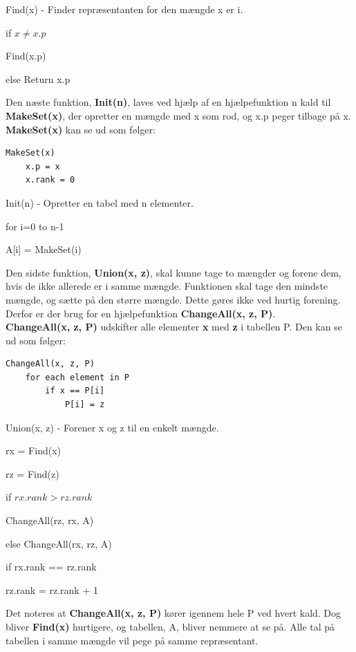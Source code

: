 \documentclass[a4paper,10pt]{article}
\begin{document}
\begin{algorithm}[H]
\caption{Find(x) - Finder repræsentanten for den mængde x er i.}
\begin{algorithmic}[2]
\State \parbox[t]{.7\linewidth}{if $x \neq x.p$}
\Indent
\State \parbox[t]{.7\linewidth}{Find(x.p)}
\EndIndent
\State \parbox[t]{.7\linewidth}{else Return x.p}
\EndFunction
\end{algorithmic}
\end{algorithm}

Den næste funktion, \textbf{Init(n)}, laves ved hjælp af en hjælpefunktion n kald til \textbf{MakeSet(x)}, der opretter en mængde med x som rod, og x.p peger tilbage på x.\\
\textbf{MakeSet(x)} kan se ud som følger:
\begin{verbatim}
MakeSet(x)
    x.p = x
    x.rank = 0
\end{verbatim}

\begin{algorithm}[H]
\caption{Init(n) - Opretter en tabel med n elementer.}
\begin{algorithmic}[2]
\State \parbox[t]{.7\linewidth}{for i=0 to n-1}
\Indent
\State \parbox[t]{.7\linewidth}{A[i] = MakeSet(i)}
\EndIndent
\EndFunction
\end{algorithmic}
\end{algorithm}

Den sidste funktion, \textbf{Union(x, z)}, skal kunne tage to mængder og forene dem, hvis de ikke allerede er i samme mængde. Funktionen skal tage den mindste mængde, og sætte på den større mængde. Dette gøres ikke ved hurtig forening. Derfor er der brug for en hjælpefunktion \textbf{ChangeAll(x, z, P)}.\\ \textbf{ChangeAll(x, z, P)} udskifter alle elementer \textbf{x} med \textbf{z} i tabellen P. Den kan se ud som følger:
\begin{verbatim}
ChangeAll(x, z, P)
    for each element in P
        if x == P[i]
            P[i] = z
\end{verbatim}

\begin{algorithm}[H]
\caption{Union(x, z) - Forener x og z til en enkelt mængde.}
\begin{algorithmic}[2]
\State \parbox[t]{.7\linewidth}{rx = Find(x)}
\State \parbox[t]{.7\linewidth}{rz = Find(z)}
\Indent
\State \parbox[t]{.7\linewidth}{if $rx.rank >  rz.rank$}
\Indent
\State \parbox[t]{.7\linewidth}{ChangeAll(rz, rx, A)}
\EndIndent
\State \parbox[t]{.7\linewidth}{else ChangeAll(rx, rz, A)}
\Indent
\State \parbox[t]{.7\linewidth}{if rx.rank == rz.rank}
\Indent
\State \parbox[t]{.7\linewidth}{rz.rank = rz.rank + 1}
\EndIndent
\EndIndent
\EndIndent
\EndFunction
\end{algorithmic}
\end{algorithm}
Det noteres at \textbf{ChangeAll(x, z, P)} kører igennem hele P ved hvert kald. Dog bliver \textbf{Find(x)} hurtigere, og tabellen, A, bliver nemmere at se på. Alle tal på tabellen i samme mængde vil pege på samme repræsentant.
\end{document}
